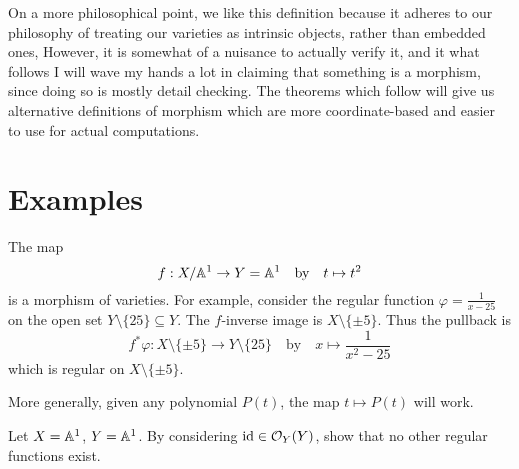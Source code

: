 On a more philosophical point, we like this definition because
it adheres to our philosophy of treating our
varieties as intrinsic objects, rather than embedded ones,
However, it is somewhat of a nuisance to actually verify it,
and it what follows I will wave my hands a lot in claiming
that something is a morphism, since doing so is mostly detail checking.
The theorems which follow will give us alternative definitions
of morphism which are more coordinate-based
and easier to use for actual computations.

\section{Examples}
\begin{example}
	The map 
	\[ f : X / \mathbb A^1 \to Y = \mathbb A^1 \quad\text{by}\quad t \mapsto t^2 \]
	is a morphism of varieties.
	For example, consider the regular function $\varphi = \frac{1}{x-25}$ on
	the open set $Y \setminus \{25\} \subseteq Y$.
	The $f$-inverse image is $X \setminus \{\pm5\}$.
	Thus the pullback is
	\[ f^\ast\varphi : X \setminus \{\pm5\} \to Y \setminus \{25\}
		\quad\text{by}\quad x \mapsto \frac{1}{x^2-25} \]
	which is regular on $X \setminus \{\pm5\}$.

	More generally, given any polynomial $P(t)$,
	the map $t \mapsto P(t)$ will work.
\end{example}
\begin{exercise}
	Let $X = \mathbb A^1$, $Y = \mathbb A^1$.
	By considering $\mathrm{id} \in \mathcal O_Y(Y)$, show that no other
	regular functions exist.
\end{exercise}

